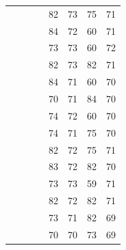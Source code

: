 \documentclass[a4,center,fleqn]{NAR}
\begin{document}
\begin{table}[h]
\begin{adjustbox}{max width=\linewidth}
\begin{tabular}{@{}llllHHHH@{}}
			\Q \OneMSevILU          & \Q \OneMSevILUMg        & \Q \OneMSevMgCE          & \Q \NAIMg             & 82       & 73       & 75             & 71           \\
			\Q \OneMSevILU          & \Q \OneMSevILUMg        & \Q \OneMSevMgCE          & \Q \CMCTMg            & 84       & 72       & 60             & 71           \\
			\Q \OneMSevILU          & \Q \OneMSevILUMg        & \Q \NMIAMgCE         & \Q \NAIMg             & 73       & 73       & 60             & 72           \\
			\Q \OneMSevILU          & \Q \OneMSevILUMg        & \Q \NMIAMgCE         & \Q \CMCTMg            & 82       & 73       & 82             & 71           \\
			\Q \OneMSevILU          & \Q \OneMSevILUThreeMg       & \Q \OneMSevMgCE          & \Q \NAIMg             & 84       & 71       & 60             & 70           \\
			\Q \OneMSevILU          & \Q \OneMSevILUThreeMg       & \Q \OneMSevMgCE          & \Q \CMCTMg            & 70       & 71       & 84             & 70           \\
			\Q \OneMSevILU          & \Q \OneMSevILUThreeMg       & \Q \NMIAMgCE         & \Q \NAIMg             & 74       & 72       & 60             & 70           \\
			\Q \OneMSevILU          & \Q \OneMSevILUThreeMg       & \Q \NMIAMgCE         & \Q \CMCTMg            & 74       & 71       & 75             & 70           \\
			\Q \NMIA            & \Q \OneMSevILUMg        & \Q \OneMSevMgCE          & \Q \NAIMg             & 82       & 72       & 75             & 71           \\
			\Q \NMIA            & \Q \OneMSevILUMg        & \Q \OneMSevMgCE          & \Q \CMCTMg            & 83       & 72       & 82             & 70           \\
			\Q \NMIA            & \Q \OneMSevILUMg        & \Q \NMIAMgCE         & \Q \NAIMg             & 73       & 73       & 59             & 71           \\
			\Q \NMIA            & \Q \OneMSevILUMg        & \Q \NMIAMgCE         & \Q \CMCTMg            & 82       & 72       & 82             & 71           \\
			\Q \NMIA            & \Q \OneMSevILUThreeMg       & \Q \OneMSevMgCE          & \Q \NAIMg             & 73       & 71       & 82             & 69           \\
			\Q \NMIA            & \Q \OneMSevILUThreeMg       & \Q \OneMSevMgCE          & \Q \CMCTMg            & 70       & 70       & 73             & 69           \\

\end{tabular}
\end{adjustbox}
\end{table}
\end{document}
